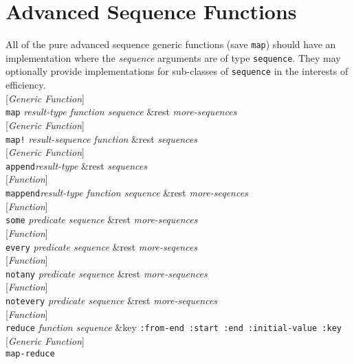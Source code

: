 \documentclass[10pt]{book}
\newenvironment{defother}[2]{[\textit{#1}]\\\texttt{#2}}{\\}
\newenvironment{defun}[1]{\begin{defother}{Function}{#1}}{\end{defother}}
\newenvironment{defgeneric}[1]{\begin{defother}{Generic Function}{#1}}{\end{defother}}
\begin{document}
\section{Advanced Sequence Functions}
All of the pure advanced sequence generic functions (save \texttt{map}) should have an implementation where the \textit{sequence} arguments are of type \texttt{sequence}. They may optionally provide implementations for sub-classes of \texttt{sequence} in the interests of efficiency.\\
\begin{defgeneric}{map} \textit{result-type function sequence} \&rest \textit{more-sequences} \end{defgeneric} %
\begin{defgeneric}{map!} \textit{result-sequence function} \&rest \textit{sequences}
\end{defgeneric}
\begin{defgeneric}{append}\textit{result-type} \&rest \textit{sequences}\end{defgeneric}
\begin{defun}{mappend}\textit{result-type function sequence} \&rest \textit{more-seqences}\end{defun} %
\begin{defun}{some} \textit{predicate sequence} \&rest \textit{more-sequences}\end{defun}
\begin{defun}{every} \textit{predicate sequence} \&rest \textit{more-seqences}\end{defun}
\begin{defun}{notany} \textit{predicate sequence} \&rest \textit{more-sequences}\end{defun}
\begin{defun}{notevery} \textit{predicate sequence} \&rest \textit{more-sequences}\end{defun}
\begin{defun}{reduce} \textit{function sequence} \&key \texttt{:from-end :start :end :initial-value :key}\end{defun}
\begin{defgeneric}{map-reduce}\end{defgeneric} %
\end{document}
